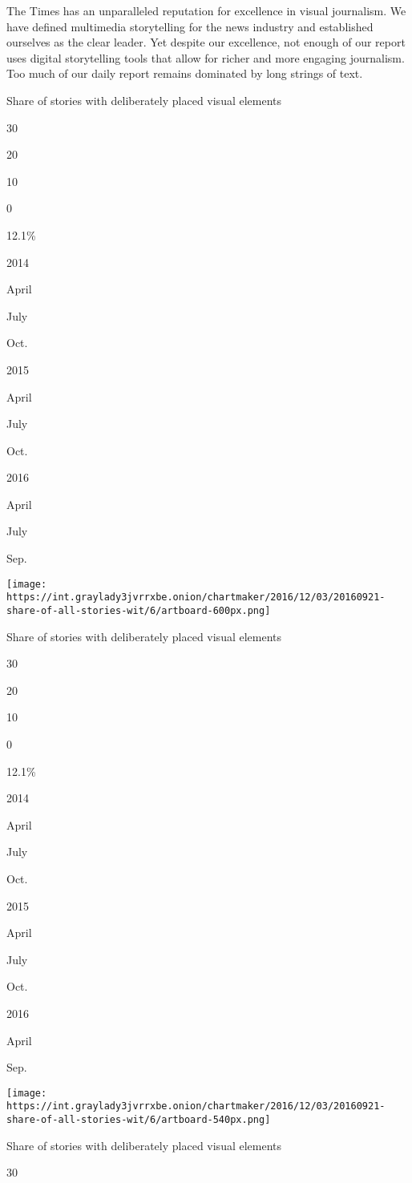 The Times has an unparalleled reputation for excellence in visual
journalism. We have defined multimedia storytelling for the news
industry and established ourselves as the clear leader. Yet despite our
excellence, not enough of our report uses digital storytelling tools
that allow for richer and more engaging journalism. Too much of our
daily report remains dominated by long strings of text.

Share of stories with deliberately placed visual elements

30

20

10

0

12.1\%

2014

April

July

Oct.

2015

April

July

Oct.

2016

April

July

Sep.

\texttt{[image: https://int.graylady3jvrrxbe.onion/chartmaker/2016/12/03/20160921-share-of-all-stories-wit/6/artboard-600px.png]}

Share of stories with deliberately placed visual elements

30

20

10

0

12.1\%

2014

April

July

Oct.

2015

April

July

Oct.

2016

April

Sep.

\texttt{[image: https://int.graylady3jvrrxbe.onion/chartmaker/2016/12/03/20160921-share-of-all-stories-wit/6/artboard-540px.png]}

Share of stories with deliberately placed visual elements

30

